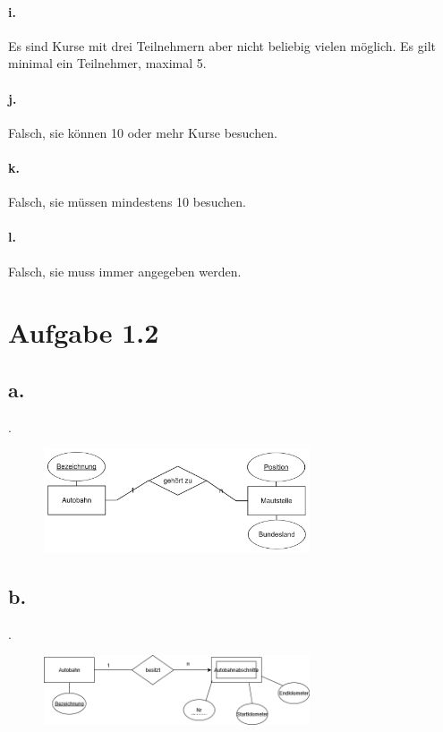 \documentclass{article}
\begin{document}
	\paragraph*{i.}Es sind Kurse mit drei Teilnehmern aber nicht beliebig vielen möglich. Es gilt minimal ein Teilnehmer, maximal 5.
	
	\paragraph*{j.}Falsch, sie können 10 oder mehr Kurse besuchen.
	
	\paragraph*{k.}Falsch, sie müssen mindestens 10 besuchen.
	
	\paragraph*{l.}Falsch, sie muss immer angegeben werden.


	\newpage	
	\section*{Aufgabe 1.2}
	\subsection*{a.}
	.
	\begin{figure}[h]
		\includegraphics[width=0.7\textwidth]{aufgabe_1_2_a.png}
	\end{figure}
	
	\subsection*{b.}
	. 
	\begin{figure}[h]
		\includegraphics[width=0.7\textwidth]{aufgabe_1_2_b.png}
	\end{figure}
	
\end{document}
